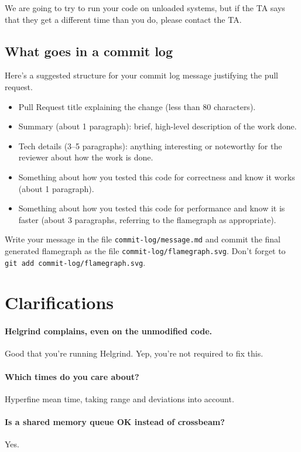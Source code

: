 We are going to try to run your code on unloaded systems, but if the TA says that they get a different time than you do,
please contact the TA.

\subsection*{What goes in a commit log}
Here's a suggested structure for your commit log message justifying the pull request.
\begin{itemize}
\item Pull Request title explaining the change (less than 80 characters).
\item Summary (about 1 paragraph): brief, high-level description of the work done.
\item Tech details (3--5 paragraphs): anything interesting or noteworthy for the reviewer about how the work is done. 
\item Something about how you tested this code for correctness and know it works (about 1 paragraph).
\item Something about how you tested this code for performance and know it is faster (about 3 paragraphs, referring to the flamegraph as appropriate).
\end{itemize}
Write your message in the file {\tt commit-log/message.md} and commit the final generated flamegraph as the file {\tt commit-log/flamegraph.svg}. Don't forget to {\tt git add commit-log/flamegraph.svg}.

\section*{Clarifications}

\paragraph{Helgrind complains, even on the unmodified code.} Good that you're running Helgrind. Yep, you're not required to fix this.

\paragraph{Which times do you care about?} Hyperfine mean time, taking range and deviations into account.

\paragraph{Is a shared memory queue OK instead of crossbeam?} Yes.

